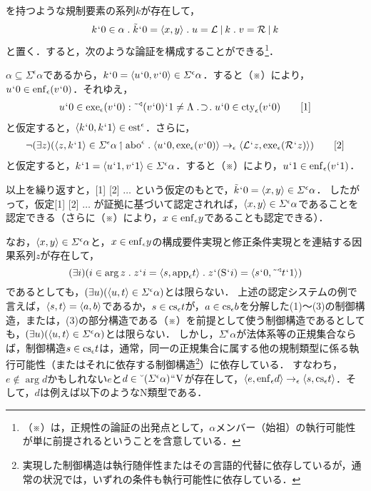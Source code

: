 を持つような規制要素の系列$ k $が存在して，
\[
    k\fap 0 \in\alpha\con{1}\tilde{k}\fap 0 = \orp{x,y}\con{1}u = \mathcal{L}\resl k\con{1}v = \mathcal{R}\resl k
\]
と置く．すると，次のような論証を構成することができる\footnote{
    （※）は，正規性の論証の出発点として，$ \alpha $メンバー（始祖）の執行可能性が単に前提されるということを含意している．
}．
\begin{nom}
    \setcounter{equation}{0}
$ \alpha\subseteq\varSigma^{\epsilon}\alpha $であるから，$ k{\mspace{1mu}{`}\mspace{1mu}} 0 =\langle u{\mspace{1mu}{`}\mspace{1mu}} 0,v{\mspace{1mu}{`}\mspace{1mu}} 0 \rangle\in\varSigma^{\epsilon}\alpha $．すると（※）により，
    $ u{\mspace{1mu}{`}\mspace{1mu}} 0\in\mathrm{enf}_{\epsilon}(v{\mspace{1mu}{`}\mspace{1mu}} 0) $．それゆえ，
    \begin{align}
        u\fap 0\in\exe{\epsilon}{(v\fap 0)}\con{2}
        \tildel{\trgl{(v\fap 0)}}\fap 1\neq\Lambda\case{1}{1}{1}
        u\fap 0\in\cty{\epsilon}(v\fap 0)
        \tag*{[1]}
    \end{align}
    と仮定すると，$ \langle k{\mspace{1mu}{`}\mspace{1mu}} 0,k{\mspace{1mu}{`}\mspace{1mu}} 1 \rangle\in\mathrm{est}^\epsilon $．さらに，
    \begin{align}
        \neg(\exists z)(\orp{z,k\fap 1}\in \varSigma^{\epsilon}\alpha\uphl\mathrm{abo}^\epsilon\con{1}
        \orp{u\fap 0,\exe{\epsilon}{(v\fap 0)}}\to_{\epsilon}\orp{\mathcal{L}\fap z,\exe{\epsilon}{(\mathcal{R}\fap z)}}
        )
        \tag*{[2]}
    \end{align}
    と仮定すると，$ k{\mspace{1mu}{`}\mspace{1mu}} 1 = \langle u{\mspace{1mu}{`}\mspace{1mu}} 1,v{\mspace{1mu}{`}\mspace{1mu}} 1 \rangle\in \varSigma^{\epsilon}\alpha $．すると（※）により，$ u{\mspace{1mu}{`}\mspace{1mu}} 1\in\mathrm{enf}_{\epsilon}(v{\mspace{1mu}{`}\mspace{1mu}} 1) $．
    
    以上を繰り返すと，[1] [2] $\dots$ という仮定のもとで，$ \tilde{k}{\mspace{1mu}{`}\mspace{1mu}} 0 = \langle x,y \rangle\in \varSigma^{\epsilon}\alpha $．
    したがって，仮定[1] [2] $\dots$ が証拠に基づいて認定されれば，$ \langle x,y \rangle\in \varSigma^{\epsilon}\alpha $であることを認定できる（さらに（※）により，$ x\in\mathrm{enf}_{\epsilon}y $であることも認定できる）．
\end{nom}

なお，$ \langle x,y \rangle\in \varSigma^{\epsilon}\alpha $と，$ x\in\mathrm{enf}_{\epsilon}y $の構成要件実現と修正条件実現とを連結する因果系列$ z $が存在して，
\[
    (\exists i)(
        i\in\arg z \con{1}z\fap i = \orp{s,\app{\epsilon} t}\con{1}z\fap(\mathrm{S}\fap i)= \orp{s\fap 0,\tildel{\trgl{t}}\fap 1}
    )
\]
であるとしても，$ (\exists u)(\langle u,t \rangle\in \varSigma^{\epsilon}\alpha) $とは限らない．
上述の認定システムの例で言えば，$ \langle s,t \rangle=\langle a,b \rangle $であるか，$ s\in\mathrm{cs}_{\epsilon}t $が，$ a\in\mathrm{cs}_{\epsilon}b $を分解した(1)〜(3)の制御構造，または，(3)の部分構造である（※）を前提として使う制御構造であるとしても，$ (\exists u)(\langle u,t \rangle\in \varSigma^{\epsilon}\alpha) $とは限らない．
しかし，$ \varSigma^{\epsilon}\alpha $が法体系等の正規集合ならば，制御構造$ s\in\mathrm{cs}_{\epsilon}t $は，通常，同一の正規集合に属する他の規制類型に係る執行可能性（またはそれに依存する制御構造\footnote{実現した制御構造は執行随伴性またはその言語的代替に依存しているが，通常の状況では，いずれの条件も執行可能性に依存している．}）に依存している．
すなわち，$ e\notin\arg d $かもしれない$ e $と$ d\in \breve{\:\:}(\varSigma^{\epsilon}\alpha){\mspace{1mu}{``}\mspace{1mu}}\mathrm{V} $が存在して，$ \langle e,\mathrm{enf}_{\epsilon}d \rangle\to_{\epsilon}\langle s,\mathrm{cs}_{\epsilon}t \rangle $．そして，$ d $は例えば以下のようなN類型である．

